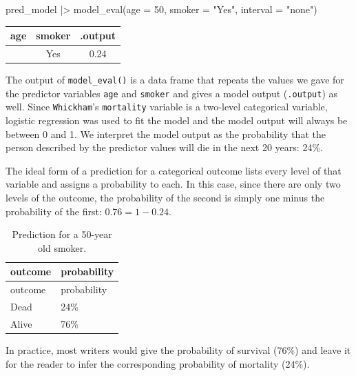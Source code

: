 \documentclass[
  letterpaper,
  DIV=11,
  numbers=noendperiod,
  oneside]{scrartcl}
\newenvironment{Shaded}{\begin{snugshade}}{\end{snugshade}}
\newcommand{\AttributeTok}[1]{\textcolor[rgb]{0.40,0.45,0.13}{#1}}
\newcommand{\DecValTok}[1]{\textcolor[rgb]{0.68,0.00,0.00}{#1}}
\newcommand{\FunctionTok}[1]{\textcolor[rgb]{0.28,0.35,0.67}{#1}}
\newcommand{\NormalTok}[1]{\textcolor[rgb]{0.00,0.23,0.31}{#1}}
\newcommand{\SpecialCharTok}[1]{\textcolor[rgb]{0.37,0.37,0.37}{#1}}
\newcommand{\StringTok}[1]{\textcolor[rgb]{0.13,0.47,0.30}{#1}}
\begin{document}
\begin{Shaded}
\begin{Highlighting}[]
\NormalTok{pred\_model }\SpecialCharTok{|\textgreater{}} \FunctionTok{model\_eval}\NormalTok{(}\AttributeTok{age =} \DecValTok{50}\NormalTok{, }\AttributeTok{smoker =} \StringTok{"Yes"}\NormalTok{, }\AttributeTok{interval =} \StringTok{"none"}\NormalTok{)}
\end{Highlighting}
\end{Shaded}

\begin{longtable}[]{@{}ccc@{}}
\toprule\noalign{}
age & smoker & .output \\
\midrule\noalign{}
\endhead
\bottomrule\noalign{}
\endlastfoot
50 & Yes & 0.24 \\
\end{longtable}

The output of \texttt{model\_eval()} is a data frame that repeats the
values we gave for the predictor variables \texttt{age} and
\texttt{smoker} and gives a model output (\texttt{.output}) as well.
Since \texttt{Whickham}'s \texttt{mortality} variable is a two-level
categorical variable, logistic regression was used to fit the model and
the model output will always be between 0 and 1. We interpret the model
output as the probability that the person described by the predictor
values will die in the next 20 years: 24\%.

The ideal form of a prediction for a categorical outcome lists every
level of that variable and assigns a probability to each. In this case,
since there are only two levels of the outcome, the probability of the
second is simply one minus the probability of the first:
\(0.76 = 1 - 0.24\).

\begin{longtable}[]{@{}ll@{}}
\caption{Prediction for a 50-year old smoker.}\tabularnewline
\toprule\noalign{}
outcome & probability \\
\midrule\noalign{}
\endfirsthead
\toprule\noalign{}
outcome & probability \\
\midrule\noalign{}
\endhead
\bottomrule\noalign{}
\endlastfoot
Dead & 24\% \\
Alive & 76\% \\
\end{longtable}

In practice, most writers would give the probability of survival (76\%)
and leave it for the reader to infer the corresponding probability of
mortality (24\%).
\end{document}
